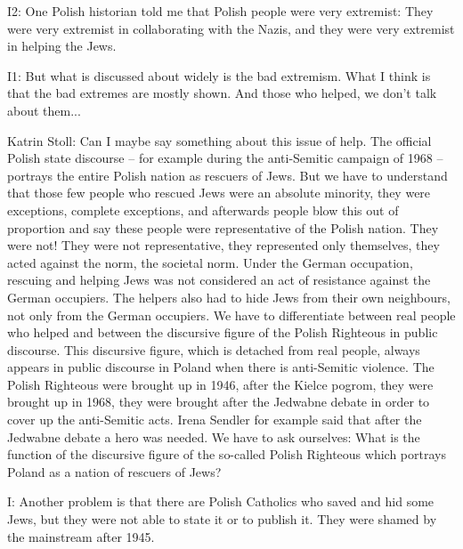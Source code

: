 I2: One Polish historian told me that Polish people were very extremist: They were very extremist in collaborating with the Nazis, and they were very extremist in helping the Jews. 

I1: But what is discussed about widely is the bad extremism. What I think is that the bad extremes are mostly shown. And those who helped, we don’t talk about them... 

 

Katrin Stoll: Can I maybe say something about this issue of help. The official Polish state discourse – for example during the anti-Semitic campaign of 1968 – portrays the entire Polish nation as rescuers of Jews. But we have to understand that those few people who rescued Jews were an absolute minority, they were exceptions, complete exceptions, and afterwards people blow this out of proportion and say these people were representative of the Polish nation. They were not! They were not representative, they represented only themselves, they acted against the norm, the societal norm. Under the German occupation, rescuing and helping Jews was not considered an act of resistance against the German occupiers. The helpers also had to hide Jews from their own neighbours, not only from the German occupiers. We have to differentiate between real people who helped and between the discursive figure of the Polish Righteous in public discourse. This discursive figure, which is detached from real people, always appears in public discourse in Poland when there is anti-Semitic violence. The Polish Righteous were brought up in 1946, after the Kielce pogrom, they were brought up in 1968, they were brought after the Jedwabne debate in order to cover up the anti-Semitic acts. Irena Sendler for example said that after the Jedwabne debate a hero was needed. We have to ask ourselves: What is the function of the discursive figure of the so-called Polish Righteous which portrays Poland as a nation of rescuers of Jews? 

 

I: Another problem is that there are Polish Catholics who saved and hid some Jews, but they were not able to state it or to publish it. They were shamed by the mainstream after 1945. 

 

